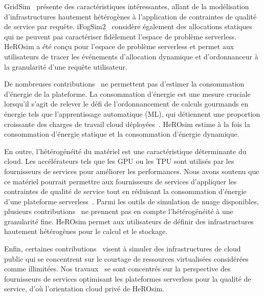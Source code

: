 GridSim~\cite{buyyaGridSimToolkitModeling2002} présente des caractéristiques intéressantes, allant de la modélisation d'infrastructures hautement hétérogènes à l'application de contraintes de qualité de service par requête. iFogSim2~\cite{mahmudIFogSim2ExtendedIFogSim2021} considère également des allocations statiques qui ne peuvent pas caractériser fidèlement l'espace de problème serverless. HeROsim a été conçu pour l'espace de problème serverless et permet aux utilisateurs de tracer les événements d'allocation dynamique et d'ordonnanceur à la granularité d'une requête utilisateur.

De nombreuses contributions~\cite{jeonCloudSimExtensionSimulatingDistributed2019, cai_elasticsim_2017, buyyaGridSimToolkitModeling2002, nunez_icancloud_2012} ne permettent pas d'estimer la consommation d'énergie de la plateforme. La consommation d'énergie est une mesure cruciale lorsqu'il s'agit de relever le défi de l'ordonnancement de calculs gourmands en énergie tels que l'apprentissage automatique (ML), qui détiennent une proportion croissante des charges de travail cloud déployées~\cite{masanetRecalibratingGlobalData2020}. 
HeROsim estime à la fois la consommation d'énergie statique et la consommation d'énergie dynamique.

En outre, l'hétérogénéité du matériel est une caractéristique déterminante du cloud. Les accélérateurs tels que les GPU ou les TPU sont utilisés par les fournisseurs de services pour améliorer les performances. Nous avons soutenu que ce matériel pourrait permettre aux fournisseurs de services d'appliquer les contraintes de qualité de service tout en réduisant la consommation d'énergie d'une plateforme serverless~\cite{herofake}.
Parmi les outils de simulation de nuage disponibles, plusieurs contributions~\cite{jeonCloudSimExtensionSimulatingDistributed2019, cai_elasticsim_2017, nunez_icancloud_2012, mahmoudiSimFaaSPerformanceSimulator2021} ne prennent pas en compte l'hétérogénéité à une granularité fine. HeROsim permet aux utilisateurs de définir des infrastructures hautement hétérogènes pour le calcul et le stockage.

Enfin, certaines contributions~\cite{nunez_icancloud_2012, mahmoudiSimFaaSPerformanceSimulator2021} visent à simuler des infrastructures de cloud public qui se concentrent sur le courtage de ressources virtualisées considérées comme illimitées. Nos travaux~\cite{herofake, herocache} se sont concentrés sur la perspective des fournisseurs de services optimisant les plateformes serverless pour la qualité de service, d'où l'orientation cloud privé de HeROsim.


